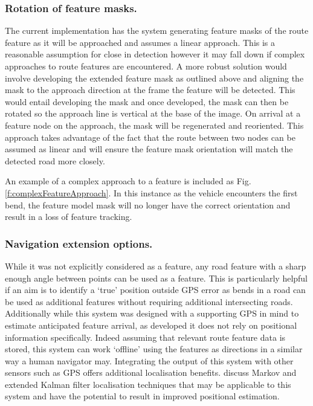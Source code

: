 \documentclass[]{aiaa-tc}%
\begin{document}
\subsubsection{Rotation of feature masks.} The current implementation has the system generating feature masks of the route feature as it will be approached and assumes a linear approach. This is a reasonable assumption for close in detection however it may fall down if complex approaches to route features are encountered. A more robust solution would involve developing the extended feature mask as outlined above and aligning the mask to the approach direction at the frame the feature will be detected. This would entail developing the mask and once developed, the mask can then be rotated so the approach line is vertical at the base of the image. On arrival at a feature node on the approach, the mask will be regenerated and reoriented. This approach takes advantage of the fact that the route between two nodes can be assumed as linear and will ensure the feature mask orientation will match the detected road more closely. 

An example of a complex approach to a feature is included as Fig. \ref{f:complexFeatureApproach}. In this instance as the vehicle encounters the first bend, the feature model mask will no longer have the correct orientation and result in a loss of feature tracking. 


\subsubsection{Navigation extension options.} While it was not explicitly considered as a feature, any road feature with a sharp enough angle between points can be used as a feature. This is particularly helpful if an aim is to identify a `true' position outside GPS error as bends in a road can be used as additional features without requiring additional intersecting roads. Additionally while this system was designed with a supporting GPS in mind to estimate anticipated feature arrival, as developed it does not rely on positional information specifically. Indeed assuming that relevant route feature data is stored, this system can work `offline' using the features as directions in a similar way a human navigator may. Integrating the output of this system with other sensors such as GPS offers additional localisation benefits. \citet{probabalisticRobotics} discuss Markov and extended Kalman filter localisation techniques that may be applicable to this system and have the potential to result in improved positional estimation.
\end{document}
